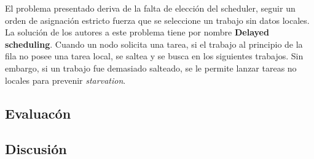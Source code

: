 \vspace{2mm}

El problema presentado deriva de la falta de elecci\'on del scheduler, seguir un orden de asignaci\'on estricto fuerza que se seleccione un trabajo sin datos locales. La soluci\'on de los autores a este problema tiene por nombre \textbf{Delayed scheduling}. Cuando un nodo solicita una tarea, si el trabajo al principio de la fila no posee una tarea local, se saltea y se busca en los siguientes trabajos. Sin embargo, si un trabajo fue demasiado salteado, se le permite lanzar tareas no locales para prevenir \emph{starvation}.

\subsection{Evaluac\'on}

\subsection{Discusi\'on}
